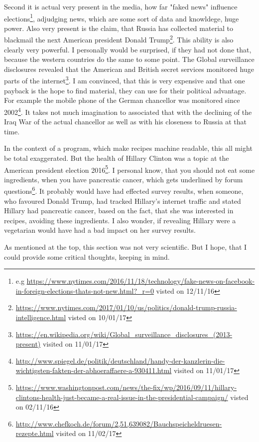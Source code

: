 \documentclass[12pt, twoside]{report}
\begin{document}
Second it is actual very present in the media, how far "faked news" influence elections\footnote{e.g \url{https://www.nytimes.com/2016/11/18/technology/fake-news-on-facebook-in-foreign-elections-thats-not-new.html?_r=0} visted on 12/11/16}, adjudging news, which are some sort of data and knowldege, huge power. Also very present is the claim, that Russia has collected material to blackmail the next American president Donald Trump\footnote{\url{https://www.nytimes.com/2017/01/10/us/politics/donald-trump-russia-intelligence.html} visted on 10/01/17}. This ability is also clearly very powerful. I personally would be surprised, if they had not done that, because the western countries do the same to some point. The Global surveillance disclosures revealed that the American and British secret services monitored huge parts of the internet\footnote{\url{https://en.wikipedia.org/wiki/Global_surveillance_disclosures_(2013-present)} visited on 11/01/17}. I am convinced, that this is very expensive and that one payback is the hope to find material, they can use for their political advantage. For example the mobile phone of the German chancellor was monitored since 2002\footnote{\url{http://www.spiegel.de/politik/deutschland/handy-der-kanzlerin-die-wichtigsten-fakten-der-abhoeraffaere-a-930411.html} visited on 11/01/17}. It takes not much imagination to associated that with the declining of the Iraq War of the actual chancellor as well as with his closeness to Russia at that time.

In the context of a program, which make recipes machine readable, this all might be total exaggerated. But the health of Hillary Clinton was a topic at the American president election 2016\footnote{\url{https://www.washingtonpost.com/news/the-fix/wp/2016/09/11/hillary-clintons-health-just-became-a-real-issue-in-the-presidential-campaign/} visted on 02/11/16}. I personal know, that you should not eat some ingredients, when you have pancreatic cancer, which gets underlined by forum questions\footnote{\url{http://www.chefkoch.de/forum/2,51,639082/Bauchspeicheldruesen-rezepte.html} visited on 11/02/17}. It probably would have had effected survey results, when someone, who favoured Donald Trump, had tracked Hillary's internet traffic and stated Hillary had pancreatic cancer, based on the fact, that she was interested in recipes, avoiding these ingredients. I also wonder, if revealing Hillary were a vegetarian would have had a bad impact on her survey results. 

As mentioned at the top, this section was not very scientific. But I hope, that I could provide some critical thoughts, keeping in mind.
\end{document}

